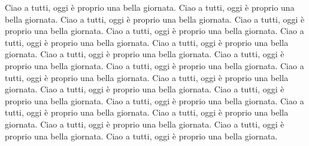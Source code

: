 \documentclass{article}
\begin{document}
Ciao a tutti, oggi è proprio una bella giornata.
Ciao a tutti, oggi è proprio una bella giornata.
Ciao a tutti, oggi è proprio una bella giornata.
Ciao a tutti, oggi è proprio una bella giornata.
Ciao a tutti, oggi è proprio una bella giornata.
Ciao a tutti, oggi è proprio una bella giornata.
Ciao a tutti, oggi è proprio una bella giornata.
Ciao a tutti, oggi è proprio una bella giornata.
Ciao a tutti, oggi è proprio una bella giornata.
Ciao a tutti, oggi è proprio una bella giornata.
Ciao a tutti, oggi è proprio una bella giornata.
Ciao a tutti, oggi è proprio una bella giornata.
Ciao a tutti, oggi è proprio una bella giornata.
Ciao a tutti, oggi è proprio una bella giornata.
Ciao a tutti, oggi è proprio una bella giornata.
Ciao a tutti, oggi è proprio una bella giornata.
Ciao a tutti, oggi è proprio una bella giornata.
Ciao a tutti, oggi è proprio una bella giornata.
Ciao a tutti, oggi è proprio una bella giornata.
Ciao a tutti, oggi è proprio una bella giornata.
\end{document}
